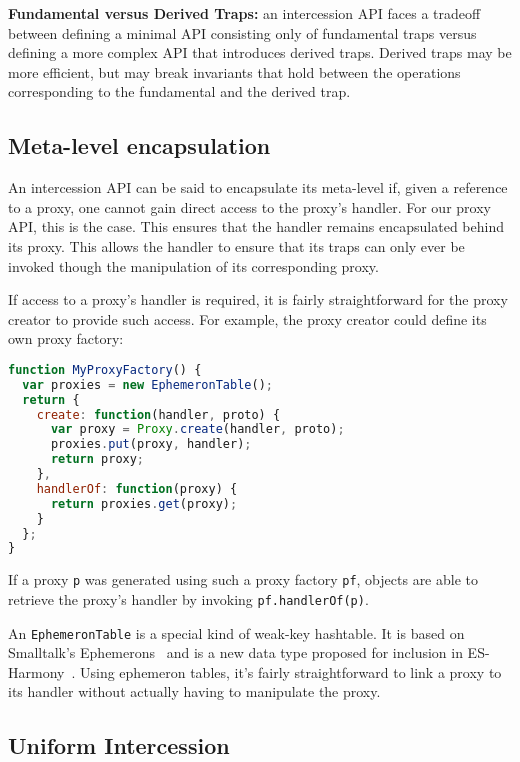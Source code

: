 \documentclass{acm_proc_article-sp}
\begin{document}
\textbf{Fundamental versus Derived Traps:} an intercession API faces a tradeoff between defining a minimal API consisting only of fundamental traps versus defining a more complex API that introduces derived traps. Derived traps may be more efficient, but may break invariants that hold between the operations corresponding to the fundamental and the derived trap.

\subsection{Meta-level encapsulation}
\label{sub:meta_level_encapsulation}

An intercession API can be said to encapsulate its meta-level if, given a reference to a proxy, one cannot gain direct access to the proxy's handler. For our proxy API, this is the case. This ensures that the handler remains encapsulated behind its proxy. This allows the handler to ensure that its traps can only ever be invoked though the manipulation of its corresponding proxy.

If access to a proxy's handler is required, it is fairly straightforward for the proxy creator to provide such access. For example, the proxy creator could define its own proxy factory:

\begin{lstlisting}[language=javascript]
function MyProxyFactory() {
  var proxies = new EphemeronTable();
  return {
    create: function(handler, proto) {
      var proxy = Proxy.create(handler, proto);
      proxies.put(proxy, handler);
      return proxy;
    },
    handlerOf: function(proxy) {
      return proxies.get(proxy);
    }
  };
}
\end{lstlisting}

If a proxy \texttt{p} was generated using such a proxy factory \texttt{pf}, objects are able to retrieve the proxy's handler by invoking \texttt{pf.handlerOf(p)}.

An \texttt{EphemeronTable} is a special kind of weak-key hashtable. It is based on Smalltalk's Ephemerons~\cite{et_paper} and is a new data type proposed for inclusion in ES-Harmony~\cite{et_proposal}.
Using ephemeron tables, it's fairly straightforward to link a proxy to its handler without actually having to manipulate the proxy.

\subsection{Uniform Intercession}
\label{sub:uniform_intercession}
\end{document}
